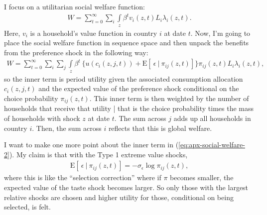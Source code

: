 \documentclass[12pt,pdftex]{article}
\begin{document}
\begin{onehalfspacing}
I focus on a utilitarian social welfare function:
\begin{align}
W = \sum_{t=0}^{\infty} \sum_{i}  \int\limits_{z} \beta^{t}  v_{i}(z,t) L_{i}\lambda_{i}(z,t).
\label{eq:apx-social-welfare}
\end{align}
Here, $v_i$ is a household's value function in country $i$ at date $t$. Now, I'm going to place the social welfare function in sequence space and then unpack the benefits from the preference shock in the following way:
\begin{align}
W = \sum_{t=0}^{\infty}  \sum_{i}  \sum_{j}  \int\limits_{z}  \beta^{t} \   \bigg \{  u(c_{i}(z, j, t) ) + \mathrm{E}[ \ \epsilon \ | \ \pi_{ij}(z,t) ] \bigg \}\pi_{ij}(z,t) L_{i} \lambda_{i}(z, t),
\label{eq:apx-social-welfare-2}
\end{align}
so the inner term is period utility given the associated consumption allocation $c_{i}(z, j, t)$ and the expected value of the preference shock conditional on the choice probability $\pi_{ij}(z,t)$. This inner term is then weighted by the number of households that receive that utility | that is the choice probability times the mass of households with shock $z$ at date $t$. The sum across $j$ adds up all households in country $i$. Then, the sum across $i$ reflects that this is global welfare.

I want to make one more point about the inner term in (\ref{eq:apx-social-welfare-2}). My claim is that with the Type 1 extreme value shocks,
\begin{align}
\mathrm{E}[ \ \epsilon \ | \ \pi_{ij}(z,t) ] = -\sigma_{\epsilon} \log \pi_{ij}(z,t),
\end{align}
where this is like the ``selection correction'' where if $\pi$ becomes smaller, the expected value of the taste shock becomes larger. So only those with the largest relative shocks are chosen and higher utility for those, conditional on being selected, is felt.


\end{onehalfspacing}
\end{document}
